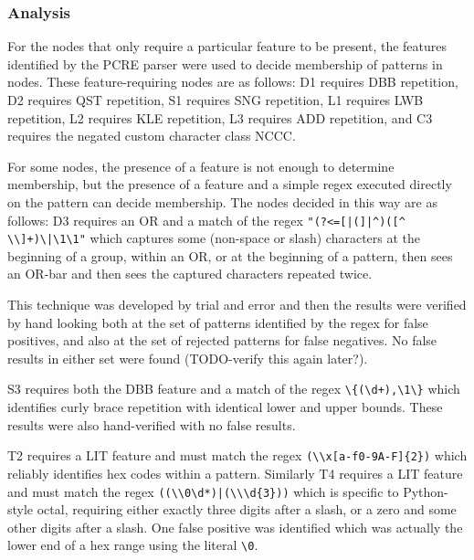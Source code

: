 \subsubsection{Analysis}
\label{communityanalysis}
For the nodes that only require a particular feature to be present, the features identified by the PCRE parser were used to decide membership of patterns in nodes.  These feature-requiring nodes are as follows: D1 requires DBB repetition, D2 requires QST repetition, S1 requires SNG repetition, L1 requires LWB repetition, L2 requires KLE repetition, L3 requires ADD repetition, and C3 requires the negated custom character class NCCC.

For some nodes, the presence of a feature is not enough to determine membership, but the presence of a feature and a simple regex executed directly on the pattern can decide membership.  The nodes decided in this way are as follows: D3 requires an OR and a match of the regex \verb!"(?<=[|(]|^)([^ \\]+)\|\1\1"! which captures some (non-space or slash) characters at the beginning of a group, within an OR, or at the beginning of a pattern, then sees an OR-bar and then sees the captured characters repeated twice.

This technique was developed by trial and error and then the results were verified by hand looking both at the set of patterns identified by the regex for false positives, and also at the set of rejected patterns for false negatives.  No false results in either set were found (TODO-verify this again later?).


S3 requires both the DBB feature and a match of the regex \verb!\{(\d+),\1\}! which identifies curly brace repetition with identical lower and upper bounds.  These results were also hand-verified with no false results.


T2 requires a LIT feature and must match the regex \verb!(\\x[a-f0-9A-F]{2})! which reliably identifies hex codes within a pattern.  Similarly T4 requires a LIT feature and must match the regex \verb!((\\0\d*)|(\\\d{3}))! which is specific to Python-style octal, requiring either exactly three digits after a slash, or a zero and some other digits after a slash.  One false positive was identified which was actually the lower end of a hex range using the literal \verb!\0!.

